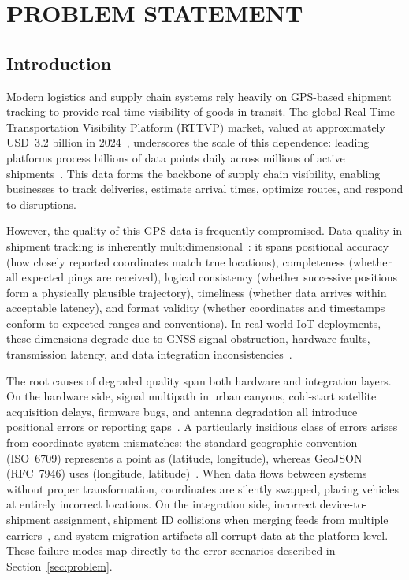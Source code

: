 \chapter{PROBLEM STATEMENT}

\section{Introduction}
Modern logistics and supply chain systems rely heavily on GPS-based shipment tracking to provide real-time visibility of goods in transit. The global Real-Time Transportation Visibility Platform (RTTVP) market, valued at approximately USD~3.2 billion in 2024~\cite{dataintelo2024rttvp}, underscores the scale of this dependence: leading platforms process billions of data points daily across millions of active shipments~\cite{project44_2025gartner, fourkites2024genai}. This data forms the backbone of supply chain visibility, enabling businesses to track deliveries, estimate arrival times, optimize routes, and respond to disruptions.

However, the quality of this GPS data is frequently compromised. Data quality in shipment tracking is inherently multidimensional~\cite{wang1996beyond, iso19157, ariza2021geospatial}: it spans positional accuracy (how closely reported coordinates match true locations), completeness (whether all expected pings are received), logical consistency (whether successive positions form a physically plausible trajectory), timeliness (whether data arrives within acceptable latency), and format validity (whether coordinates and timestamps conform to expected ranges and conventions). In real-world IoT deployments, these dimensions degrade due to GNSS signal obstruction, hardware faults, transmission latency, and data integration inconsistencies~\cite{kuras2024assessment}.

The root causes of degraded quality span both hardware and integration layers. On the hardware side, signal multipath in urban canyons, cold-start satellite acquisition delays, firmware bugs, and antenna degradation all introduce positional errors or reporting gaps~\cite{peretic2025multipath, hubbard2010hotstart, oloyede2024reliability}. A particularly insidious class of errors arises from coordinate system mismatches: the standard geographic convention (ISO~6709) represents a point as (latitude, longitude), whereas GeoJSON (RFC~7946) uses (longitude, latitude)~\cite{macwright2015geojson}. When data flows between systems without proper transformation, coordinates are silently swapped, placing vehicles at entirely incorrect locations. On the integration side, incorrect device-to-shipment assignment, shipment ID collisions when merging feeds from multiple carriers~\cite{xia2016deduplication}, and system migration artifacts all corrupt data at the platform level. These failure modes map directly to the error scenarios described in Section~\ref{sec:problem}.


